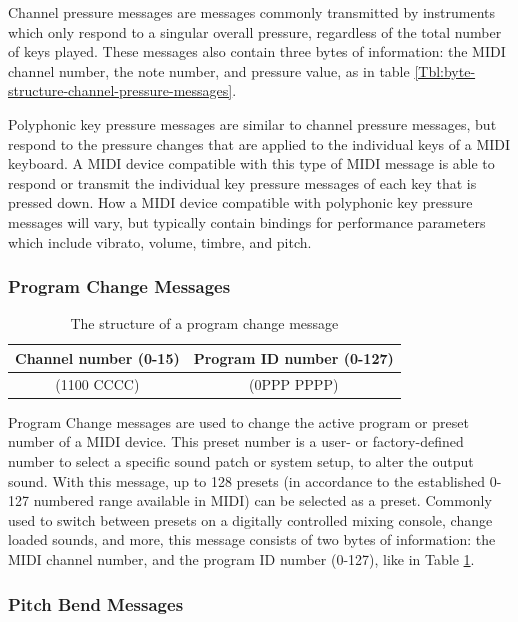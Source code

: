 Channel pressure messages are messages commonly transmitted by instruments which only respond to a singular overall pressure, regardless of the total number of keys played. These messages also contain three bytes of information: the MIDI channel number, the note number, and pressure value, as in table \ref{Tbl:byte-structure-channel-pressure-messages}\cite{Huber_2012}. 

Polyphonic key pressure messages are similar to channel pressure messages, but respond to the pressure changes that are applied to the individual keys of a MIDI keyboard. A MIDI device compatible with this type of MIDI message is able to respond or transmit the individual key pressure messages of each key that is pressed down. How a MIDI device compatible with polyphonic key pressure messages will vary, but typically contain bindings for performance parameters which include vibrato, volume, timbre, and pitch\cite{McGuire_2014}. %

\subsubsection{Program Change Messages}

\begin{table}
	\centering
	\begin{tabular}{|c|c|}
	\hline
		Channel number (0-15) & Program ID number (0-127) \\
		\hline
		(1100 CCCC) & (0PPP PPPP) \\
	\hline
	\end{tabular}
	\caption{The structure of a program change message}
	\label{tbl:byte-structure-program-change}
\end{table}

Program Change messages are used to change the active program or preset number of a MIDI device. This preset number is a user- or factory-defined number to select a specific sound patch or system setup, to alter the output sound. With this message, up to 128 presets (in accordance to the established 0-127 numbered range available in MIDI) can be selected as a preset\cite{Huber_2012}. Commonly used to switch between presets on a digitally controlled mixing console, change loaded sounds, and more, this message consists of two bytes of information: the MIDI channel number, and the program ID number (0-127), like in Table \ref{tbl:byte-structure-program-change}.


\subsubsection{Pitch Bend Messages}

